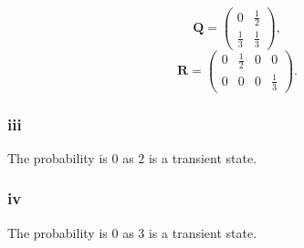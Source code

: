 \documentclass{article}
\begin{document}
\begin{equation}
    \mathbf{Q} = \begin{pmatrix}
        0 & \frac{1}{2} \\ \frac{1}{3} & \frac{1}{3}
    \end{pmatrix},
\end{equation}
\begin{equation}
    \mathbf{R} = \begin{pmatrix}
        0 & \frac{1}{2} & 0 & 0 \\
        0 & 0 & 0 & \frac{1}{3}
    \end{pmatrix}.
\end{equation}

\subsubsection{iii}
The probability is $0$ as $2$ is a transient state.

\subsubsection{iv}
The probability is $0$ as $3$ is a transient state.
\end{document}

